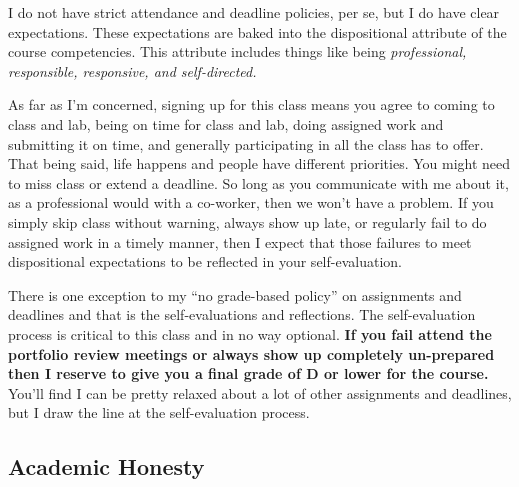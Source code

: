 \documentclass[10pt]{article}
\begin{document}
I do not have strict attendance and deadline policies, per se, but I do have clear expectations. These
expectations are baked into the dispositional attribute of the course competencies. This attribute
includes things like being \textit{professional, responsible, responsive, and self-directed.}

As far as I'm concerned, signing up for this class means you agree to coming to class and lab,
being on time for class and lab, doing assigned work and submitting it on time, and generally participating
in all the class has to offer.  That being said, life happens and people have different priorities.
You might need to miss class or extend a deadline.  So long as you communicate with me about it, as a
professional would with a co-worker, then we won't have a problem. If you simply skip class without
warning, always show up late, or regularly fail to do assigned work in a timely manner, then I expect that
those failures to meet dispositional expectations to be reflected in your self-evaluation.

There is one exception to my ``no grade-based policy'' on assignments and deadlines and that is the
self-evaluations and reflections. The self-evaluation process is critical to this class and in no way
optional. \textbf{If you fail attend the portfolio review meetings or always show up completely un-prepared
then I reserve to give you a final grade of D or lower for the course.} You'll find I can be pretty relaxed
about a lot of other assignments and deadlines, but I draw the line at the self-evaluation process.

\subsection{Academic Honesty}
\end{document}
